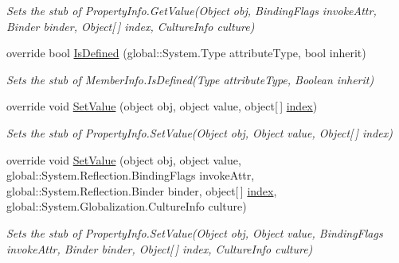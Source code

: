 \begin{DoxyCompactItemize}
\begin{DoxyCompactList}\small\item\em Sets the stub of Property\-Info.\-Get\-Value(\-Object obj, Binding\-Flags invoke\-Attr, Binder binder, Object\mbox{[}$\,$\mbox{]} index, Culture\-Info culture)\end{DoxyCompactList}\item 
override bool \hyperlink{class_system_1_1_reflection_1_1_fakes_1_1_stub_property_info_a99a951c8698e65c36be95c337d4b71dc}{Is\-Defined} (global\-::\-System.\-Type attribute\-Type, bool inherit)
\begin{DoxyCompactList}\small\item\em Sets the stub of Member\-Info.\-Is\-Defined(\-Type attribute\-Type, Boolean inherit)\end{DoxyCompactList}\item 
override void \hyperlink{class_system_1_1_reflection_1_1_fakes_1_1_stub_property_info_a8fb427e17d38eb052451fde86b206302}{Set\-Value} (object obj, object value, object\mbox{[}$\,$\mbox{]} \hyperlink{jquery-1_810_82-vsdoc_8js_a75bb12d1f23302a9eea93a6d89d0193e}{index})
\begin{DoxyCompactList}\small\item\em Sets the stub of Property\-Info.\-Set\-Value(\-Object obj, Object value, Object\mbox{[}$\,$\mbox{]} index)\end{DoxyCompactList}\item 
override void \hyperlink{class_system_1_1_reflection_1_1_fakes_1_1_stub_property_info_ab8c8ddf00044a4767edf287745fd6028}{Set\-Value} (object obj, object value, global\-::\-System.\-Reflection.\-Binding\-Flags invoke\-Attr, global\-::\-System.\-Reflection.\-Binder binder, object\mbox{[}$\,$\mbox{]} \hyperlink{jquery-1_810_82-vsdoc_8js_a75bb12d1f23302a9eea93a6d89d0193e}{index}, global\-::\-System.\-Globalization.\-Culture\-Info culture)
\begin{DoxyCompactList}\small\item\em Sets the stub of Property\-Info.\-Set\-Value(\-Object obj, Object value, Binding\-Flags invoke\-Attr, Binder binder, Object\mbox{[}$\,$\mbox{]} index, Culture\-Info culture)\end{DoxyCompactList}\end{DoxyCompactItemize}
